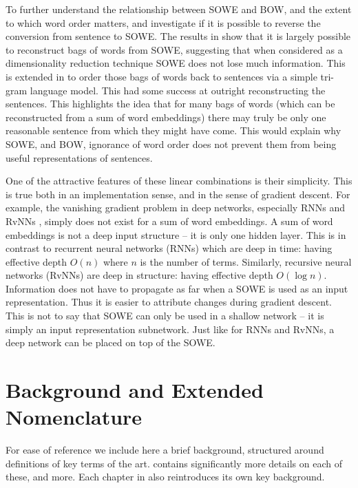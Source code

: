 \documentclass{book}
\begin{document}
To further understand the relationship between SOWE and BOW, and the extent to which word order matters,  and  investigate if it is possible to reverse the conversion from sentence to SOWE.
The results in  show that it is largely possible to reconstruct bags of words from SOWE, suggesting that when considered as a dimensionality reduction technique SOWE does not lose much information.
This is extended in  to order those bags of words back to sentences via a simple tri-gram language model.
This had some success at outright reconstructing the sentences.
This highlights the idea that for many  bags of words (which can be reconstructed from a sum of word embeddings) there may truly be only one reasonable sentence from which they might have come.
This would explain why SOWE, and BOW, ignorance of word order does not prevent them from being useful representations of sentences.


One of the attractive features of these linear combinations is their simplicity.
This is true both in an implementation sense, and in the sense of gradient descent.
For example, the vanishing gradient problem in deep networks, especially RNNs \citep{bengio1994learning}  and RvNNs \citep{socher2014recursive},
simply does not exist for a sum of word embeddings.
A sum of word embeddings is not a deep input structure -- it is only one hidden layer.
This is in contrast to recurrent neural networks (RNNs) which are deep in time: having effective depth $O(n)$ where $n$ is the number of terms.
Similarly, recursive neural networks (RvNNs) are deep in structure: having effective depth $O(\log n)$.
Information does not have to propagate as far when a SOWE is used as an input representation.
Thus it is easier to attribute changes during gradient descent.
This is not to say that SOWE can only be used in a shallow network -- it is simply an input representation subnetwork.
Just like for RNNs and RvNNs, a deep network can be placed on top of the SOWE.



\section{Background and Extended Nomenclature}
For ease of reference we include here a brief background,
structured around definitions of key terms of the art.
 contains significantly more details on each of these, and more.
Each chapter in  also reintroduces its own key background.
\end{document}
